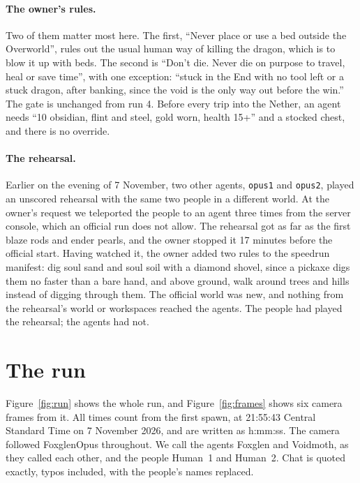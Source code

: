 \documentclass[11pt,a4paper]{article}
\begin{document}
\paragraph{The owner's rules.} Two of them matter most here. The first, ``Never place or use a bed outside the Overworld'', rules out the usual human way of killing the dragon, which is to blow it up with beds. The second is ``Don't die. Never die on purpose to travel, heal or save time'', with one exception: ``stuck in the End with no tool left or a stuck dragon, after banking, since the void is the only way out before the win.'' The gate is unchanged from run 4. Before every trip into the Nether, an agent needs ``10 obsidian, flint and steel, gold worn, health 15+'' and a stocked chest, and there is no override.

\paragraph{The rehearsal.} Earlier on the evening of 7 November, two other agents, \texttt{opus1} and \texttt{opus2}, played an unscored rehearsal with the same two people in a different world. At the owner's request we teleported the people to an agent three times from the server console, which an official run does not allow. The rehearsal got as far as the first blaze rods and ender pearls, and the owner stopped it 17 minutes before the official start. Having watched it, the owner added two rules to the speedrun manifest: dig soul sand and soul soil with a diamond shovel, since a pickaxe digs them no faster than a bare hand, and above ground, walk around trees and hills instead of digging through them. The official world was new, and nothing from the rehearsal's world or workspaces reached the agents. The people had played the rehearsal; the agents had not.

\section{The run}
\label{sec:run}

Figure~\ref{fig:run} shows the whole run, and Figure~\ref{fig:frames} shows six camera frames from it. All times count from the first spawn, at 21:55:43 Central Standard Time on 7 November 2026, and are written as h:mm:ss. The camera followed FoxglenOpus throughout. We call the agents Foxglen and Voidmoth, as they called each other, and the people Human~1 and Human~2. Chat is quoted exactly, typos included, with the people's names replaced.
\end{document}

